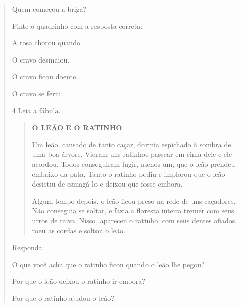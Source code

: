 \begin{verse}
\begin{escolha}
\item Quem começou a briga?


\item Pinte o quadrinho com a resposta correta:

A rosa chorou quando

\begin{boxlist}
\boxlist[] O cravo desmaiou.

\boxlist[] O cravo ficou doente.

\boxlist[] O cravo se feriu.
\end{boxlist}
\end{escolha}

\num{4} Leia a fábula.


\begin{quote}
\textbf{O LEÃO E O RATINHO}

Um leão, cansado de tanto caçar, dormia espichado à sombra de uma boa
árvore. Vieram uns ratinhos passear em cima dele e ele acordou. Todos
conseguiram fugir, menos um, que o leão prendeu embaixo da pata. Tanto o
ratinho pediu e implorou que o leão desistiu de esmagá-lo e deixou que
fosse embora.

Algum tempo depois, o leão ficou preso na rede de uns caçadores. Não
conseguia se soltar, e fazia a floresta inteira tremer com seus urros de
raiva. Nisso, apareceu o ratinho. com seus dentes afiados, roeu as
cordas e soltou o leão.
\end{quote}


Responda:

\begin{escolha}
\item O que você acha que o ratinho ficou quando o leão lhe pegou?


\item Por que o leão deixou o ratinho ir embora?


\item Por que o ratinho ajudou o leâo?


\end{escolha}
\end{verse}
